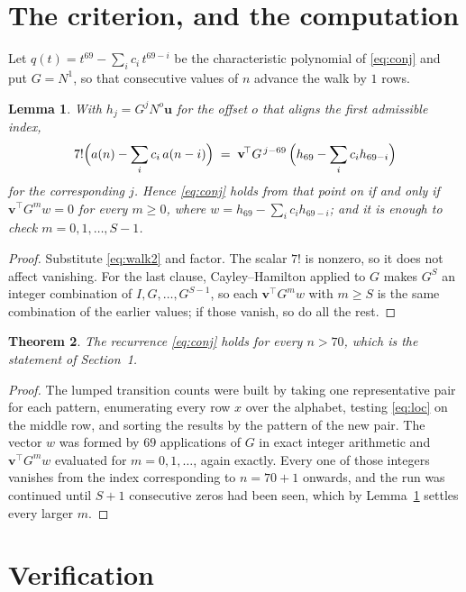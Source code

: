 \documentclass[11pt,a4paper]{article}
\theoremstyle{plain}
\newtheorem{theorem}{Theorem}
\newtheorem{lemma}[theorem]{Lemma}
\theoremstyle{definition}
\begin{document}
\section{The criterion, and the computation}

Let $q(t)=t^{69}-\sum_i c_i\,t^{69-i}$ be the characteristic polynomial of
\eqref{eq:conj} and put $G=N^{1}$, so that consecutive values of $n$ advance the
walk by $1$ rows.

\begin{lemma}\label{lem:crit}
With $h_j=G^{j}N^{o}\mathbf{u}$ for the offset $o$ that aligns the first admissible
index,
\[
7!\Bigl(a(n)-\sum_i c_i\,a(n-i)\Bigr)\;=\;\mathbf{v}^{\!\top}G^{\,j-69}\,
\Bigl(h_{69}-\sum_i c_i h_{69-i}\Bigr)
\]
for the corresponding $j$. Hence \eqref{eq:conj} holds from that point on if and only if
$\mathbf{v}^{\!\top}G^{m}w=0$ for every $m\ge0$, where
$w=h_{69}-\sum_i c_ih_{69-i}$; and it is enough to check $m=0,1,\dots,S-1$.
\end{lemma}

\begin{proof}
Substitute \eqref{eq:walk2} and factor. The scalar $7!$ is nonzero, so it does not
affect vanishing. For the last clause, Cayley--Hamilton applied to $G$ makes $G^{S}$ an
integer combination of $I,G,\dots,G^{S-1}$, so each $\mathbf{v}^{\!\top}G^{m}w$ with
$m\ge S$ is the same combination of the earlier values; if those vanish, so do all the rest.
\end{proof}

\begin{theorem}
The recurrence \eqref{eq:conj} holds for every $n>70$, which is the statement of
Section~1.
\end{theorem}

\begin{proof}
The lumped transition counts were built by taking one representative pair for each pattern,
enumerating every row $x$ over the alphabet, testing \eqref{eq:loc} on the middle
row, and sorting the results by the pattern of the new pair. The vector $w$ was formed by
$69$ applications of $G$ in exact integer arithmetic and $\mathbf{v}^{\!\top}G^{m}w$
evaluated for $m=0,1,\dots$, again exactly. Every one of those integers vanishes from the
index corresponding to $n=70+1$ onwards, and the run was continued until $S+1$
consecutive zeros had been seen, which by Lemma~\ref{lem:crit} settles every larger $m$.
\end{proof}

\section{Verification}
\end{document}
